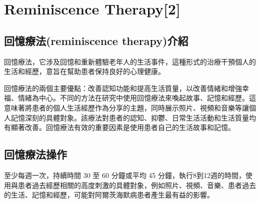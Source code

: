 \chapter{Reminiscence Therapy[2]}
\label{chapter:intro}
\section{回憶療法(reminiscence therapy)介紹}
回憶療法，它涉及回憶和重新體驗老年人的生活事件，這種形式的治療干預個人的生活和經歷，意旨在幫助患者保持良好的心理健康。

回憶療法的兩個主要優點：改善認知功能和提高生活質量，以改善情緒和增強幸福、情緒為中心。不同的方法在研究中使用回憶療法來喚起故事、記憶和經歷。這意味著將患者的個人生活經歷作為分享的主題，同時展示照片、視頻和音樂等讓個人記憶深刻的具體對象。該療法對患者的認知、抑鬱、日常生活活動和生活質量均有顯著改善。回憶療法有效的重要因素是使用患者自己的生活故事和記憶。

\section{回憶療法操作}
至少每週一次，持續時間 30 至 60 分鐘或平均 45 分鐘，執行8到12週的時間，使用與患者過去經歷相關的高度刺激的具體對象，例如照片、視頻、音樂、患者過去的生活、記憶和經歷，可能對阿爾茨海默病患者產生最有益的影響。


